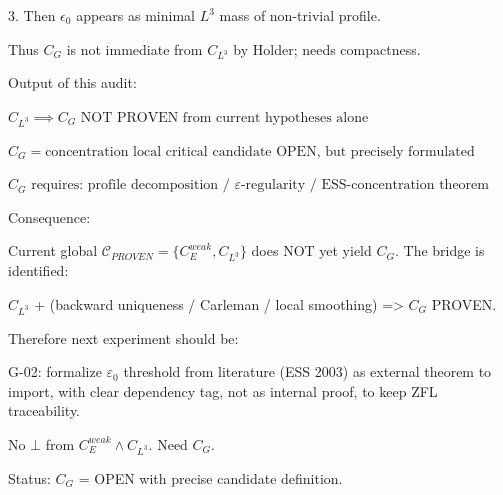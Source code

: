 \documentclass[11pt]{article}
\begin{document}
3. Then $\epsilon_0$ appears as minimal $L^3$ mass of non-trivial profile.

Thus $C_G$ is not immediate from $C_{L^3}$ by Holder; needs compactness.

Output of this audit:

$\boxed{C_{L^3}\implies C_G \text{ NOT PROVEN from current hypotheses alone}}$

$\boxed{C_G = \text{concentration local critical} \text{ candidate OPEN, but precisely formulated}}$

$\boxed{C_G \text{ requires: profile decomposition / }\varepsilon\text{-regularity / ESS-concentration theorem}}$

Consequence:

Current global $\mathcal{C}_{PROVEN}=\{C_E^{weak},C_{L^3}\}$ does NOT yet yield $C_G$. The bridge is identified:

$C_{L^3}$ + (backward uniqueness / Carleman / local smoothing) => $C_G$ PROVEN.

Therefore next experiment should be:

G-02: formalize $\varepsilon_0$ threshold from literature (ESS 2003) as external theorem to import, with clear dependency tag, not as internal proof, to keep ZFL traceability.

No $\bot$ from $C_E^{weak}\land C_{L^3}$. Need $C_G$.

Status:
$C_G$ = OPEN with precise candidate definition.
\end{document}
